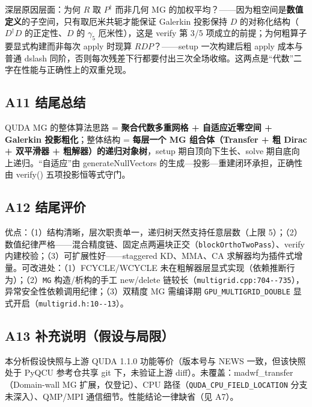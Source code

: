 \documentclass[UTF8]{ctexart}
\begin{document}
深层原因层面：为何 $R$ 取 $P^\dagger$ 而非几何 MG 的加权平均？——因为粗空间是\textbf{数值定义}的子空间，只有取厄米共轭才能保证 Galerkin 投影保持 $D$ 的对称化结构（$D^\dagger D$ 的正定性、$D$ 的 $\gamma_5$ 厄米性），这是 verify 第 3/5 项成立的前提；为何粗算子要显式构建而非每次 apply 时现算 $RDP$？——setup 一次构建后粗 apply 成本与普通 dslash 同阶，否则每次残差下行都要付出三次全场收缩。这两点是``代数''二字在性能与正确性上的双重兑现。

\subsection{A11 结尾总结}

\begin{conclbox}
QUDA MG 的整体算法思路 = \textbf{聚合代数多重网格 + 自适应近零空间 + Galerkin 投影粗化}；整体结构 = \textbf{每层一个 MG 组合体（Transfer + 粗 Dirac + 双平滑器 + 粗解器）的递归对象树}，setup 期自顶向下生长、solve 期自底向上递归。``自适应''由 generateNullVectors 的生成—投影—重建闭环承担，正确性由 verify() 五项投影恒等式守门。
\end{conclbox}

\subsection{A12 结尾评价}

优点：（1）结构清晰，层次职责单一，递归树天然支持任意层数（上限 5）；（2）数值纪律严格——混合精度链、固定点两遍块正交（\texttt{blockOrthoTwoPass}）、verify 内建校验；（3）可扩展性好——staggered KD、MMA、CA 求解器均为插件式增量。可改进处：（1）FCYCLE/WCYCLE 未在粗解器层显式实现（依赖推断行为）；（2）\texttt{MG} 构造/析构的手工 new/delete 链较长（\textcolor{evidence}{\texttt{\nolinkurl{multigrid.cpp:704--735}}}），异常安全性依赖调用纪律；（3）双精度 MG 需编译期 \texttt{GPU\_MULTIGRID\_DOUBLE} 显式开启（\textcolor{evidence}{\texttt{\nolinkurl{multigrid.h:10--13}}}）。

\subsection{A13 补充说明（假设与局限）}

本分析假设快照与上游 QUDA 1.1.0 功能等价（版本号与 NEWS 一致，但该快照处于 PyQCU 参考仓共享 git 下，\textcolor{warn}{未验证}上游 diff）。未覆盖：madwf\_transfer（Domain-wall MG 扩展，仅登记）、CPU 路径（\texttt{QUDA\_CPU\_FIELD\_LOCATION} 分支未深入）、QMP/MPI 通信细节。性能结论一律缺省（见 A7）。
\end{document}
